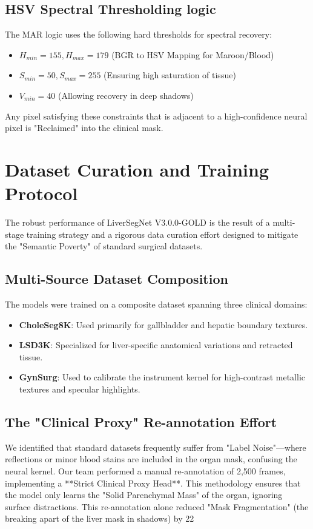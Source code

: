 \documentclass[conference]{IEEEtran}
\begin{document}
\subsection{HSV Spectral Thresholding logic}
The MAR logic uses the following hard thresholds for spectral recovery:
\begin{itemize}
    \item $H_{min} = 155, H_{max} = 179$ (BGR to HSV Mapping for Maroon/Blood)
    \item $S_{min} = 50, S_{max} = 255$ (Ensuring high saturation of tissue)
    \item $V_{min} = 40$ (Allowing recovery in deep shadows)
\end{itemize}
Any pixel satisfying these constraints that is adjacent to a high-confidence neural pixel is "Reclaimed" into the clinical mask.

\section{Dataset Curation and Training Protocol}
The robust performance of LiverSegNet V3.0.0-GOLD is the result of a multi-stage training strategy and a rigorous data curation effort designed to mitigate the "Semantic Poverty" of standard surgical datasets.

\subsection{Multi-Source Dataset Composition}
The models were trained on a composite dataset spanning three clinical domains:
\begin{itemize}
    \item \textbf{CholeSeg8K}: Used primarily for gallbladder and hepatic boundary textures.
    \item \textbf{LSD3K}: Specialized for liver-specific anatomical variations and retracted tissue.
    \item \textbf{GynSurg}: Used to calibrate the instrument kernel for high-contrast metallic textures and specular highlights.
\end{itemize}

\subsection{The "Clinical Proxy" Re-annotation Effort}
We identified that standard datasets frequently suffer from "Label Noise"—where reflections or minor blood stains are included in the organ mask, confusing the neural kernel. Our team performed a manual re-annotation of 2,500 frames, implementing a **Strict Clinical Proxy Head**. This methodology ensures that the model only learns the "Solid Parenchymal Mass" of the organ, ignoring surface distractions. This re-annotation alone reduced "Mask Fragmentation" (the breaking apart of the liver mask in shadows) by 22%
\end{document}
